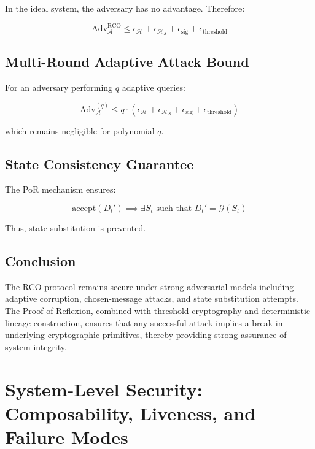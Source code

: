 In the ideal system, the adversary has no advantage. Therefore:

\begin{equation}
\text{Adv}_{\mathcal{A}}^{\text{RCO}} \leq \epsilon_{\mathcal{H}} + \epsilon_{\mathcal{H}_S} + \epsilon_{\text{sig}} + \epsilon_{\text{threshold}}
\end{equation}

\subsection{Multi-Round Adaptive Attack Bound}

For an adversary performing $q$ adaptive queries:

\begin{equation}
\text{Adv}_{\mathcal{A}}^{(q)} \leq q \cdot (\epsilon_{\mathcal{H}} + \epsilon_{\mathcal{H}_S} + \epsilon_{\text{sig}} + \epsilon_{\text{threshold}})
\end{equation}

which remains negligible for polynomial $q$.

\subsection{State Consistency Guarantee}

The PoR mechanism ensures:

\begin{equation}
\text{accept}(D_t') \implies \exists S_t \text{ such that } D_t' = \mathcal{G}(S_t)
\end{equation}

Thus, state substitution is prevented.

\subsection{Conclusion}

The RCO protocol remains secure under strong adversarial models including adaptive corruption, chosen-message attacks, and state substitution attempts. The Proof of Reflexion, combined with threshold cryptography and deterministic lineage construction, ensures that any successful attack implies a break in underlying cryptographic primitives, thereby providing strong assurance of system integrity.

\section{System-Level Security: Composability, Liveness, and Failure Modes}


